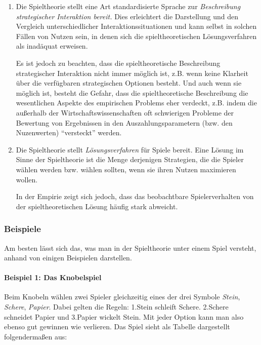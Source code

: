 \begin{enumerate}
  \item Die Spieltheorie stellt eine Art standardisierte Sprache zur
  {\em Beschreibung strategischer Interaktion bereit.} Dies erleichtert die
  Darstellung und den Vergleich unterschiedlicher Interaktionssituationen und
  kann selbst in solchen Fällen von Nutzen sein, in denen sich die
  spieltheoretischen Lösungsverfahren als inadäquat erweisen. 
  
  \begin{footnotesize}
  Es ist jedoch zu
  beachten, dass die spieltheoretische Beschreibung strategischer Interaktion
  nicht immer möglich ist, z.B. wenn keine Klarheit über die verfügbaren
  strategischen Optionen besteht. Und auch wenn sie möglich ist, besteht die
  Gefahr, dass die spieltheoretische Beschreibung die wesentlichen Aspekte des
  empirischen Problems eher verdeckt, z.B. indem die außerhalb der
  Wirtschaftswissenschaften oft schwierigen Probleme der Bewertung von
  Ergebnissen in den Auszahlungsparametern (bzw. den Nuzenwerten)
  "`versteckt"' werden.
  \end{footnotesize}

  \item Die Spieltheorie stellt {\em Lösungsverfahren} für Spiele bereit. Eine
  Lösung im Sinne der Spieltheorie ist die Menge derjenigen Strategien, die
  die Spieler wählen werden bzw. wählen sollten, wenn sie ihren Nutzen
  maximieren wollen.
  
  \begin{footnotesize}
  In der Empirie zeigt sich jedoch, dass das beobachtbare
  Spielerverhalten von der spieltheoretischen Lösung häufig stark abweicht.  
  \end{footnotesize}
\end{enumerate}

\subsubsection{Beispiele}

Am besten lässt sich das, was man in der Spieltheorie unter einem Spiel
versteht, anhand von einigen Beispielen darstellen.

\paragraph{Beispiel 1: Das Knobelspiel}

Beim Knobeln wählen zwei Spieler gleichzeitig eines der drei Symbole {\em
Stein}, {\em Schere}, {\em Papier}. Dabei gelten die Regeln: 1.Stein schleift
Schere. 2.Schere schneidet Papier und 3.Papier wickelt Stein. Mit jeder Option
kann man also ebenso gut gewinnen wie verlieren. Das Spiel sieht als Tabelle
dargestellt folgendermaßen aus:

